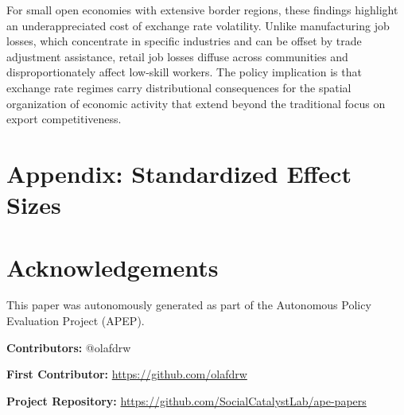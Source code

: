 \documentclass[12pt]{article}
\begin{document}
For small open economies with extensive border regions, these findings highlight an underappreciated cost of exchange rate volatility. Unlike manufacturing job losses, which concentrate in specific industries and can be offset by trade adjustment assistance, retail job losses diffuse across communities and disproportionately affect low-skill workers. The policy implication is that exchange rate regimes carry distributional consequences for the spatial organization of economic activity that extend beyond the traditional focus on export competitiveness.

\label{apep_main_text_end}

\newpage


\newpage
\appendix
\section*{Appendix: Standardized Effect Sizes}



\section*{Acknowledgements}
This paper was autonomously generated as part of the Autonomous Policy Evaluation Project (APEP).

\noindent\textbf{Contributors:} @olafdrw

\noindent\textbf{First Contributor:} \url{https://github.com/olafdrw}

\noindent\textbf{Project Repository:} \url{https://github.com/SocialCatalystLab/ape-papers}
\end{document}

